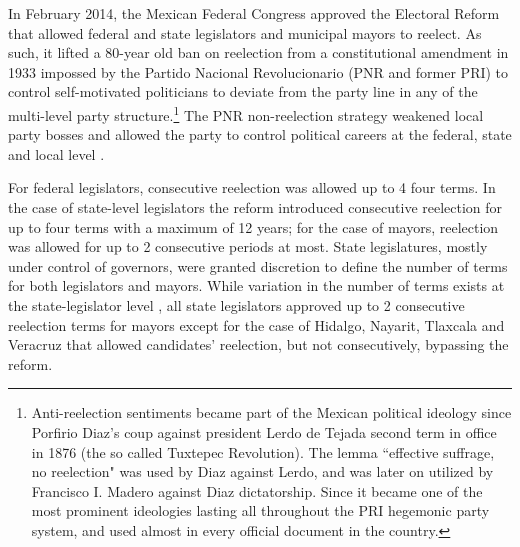 \documentclass[12pt]{amsart}
\makeatletter
\def\section{\@startsection{section}{1}
	\z@{1.0\linespacing\@plus\linespacing}{.5\linespacing}{\Large}}
\numberwithin{equation}{section}
\theoremstyle{definition}
\theoremstyle{definition}
\theoremstyle{definition}
\makeatother
\begin{document}


\section{Term Limit Reform of 2014 \label{sec:reform}} 

In February 2014, the Mexican Federal Congress approved the Electoral Reform that allowed federal and state legislators and municipal mayors to reelect. As such, it lifted a 80-year old ban on reelection from a constitutional amendment in 1933 impossed by the Partido Nacional Revolucionario (PNR and former PRI) to control self-motivated politicians to deviate from the party line in any of the multi-level party structure.\footnote{Anti-reelection sentiments became part of the Mexican political ideology since Porfirio Diaz's coup against president Lerdo de Tejada second term in office in 1876 (the so called Tuxtepec Revolution). The lemma ``effective suffrage, no reelection" was used by Diaz against Lerdo, and was later on utilized by Francisco I. Madero against Diaz dictatorship. Since it became one of the most prominent ideologies lasting all throughout the PRI hegemonic party system, and used almost in every official document in the country.} The PNR non-reelection strategy weakened local party bosses and allowed the party to control political careers at the federal, state and local level \citep{weldon_2003}. 

For federal legislators, consecutive reelection was allowed up to 4 four terms. In the case of state-level legislators the reform introduced consecutive reelection for up to four terms with a maximum of 12 years; for the case of mayors, reelection was allowed for up to 2 consecutive periods at most. State legislatures, mostly under control of governors, were granted discretion to define the number of terms for both legislators and mayors. While variation in the number of terms exists at the state-legislator level \citep{motolinia_2020}, all state legislators approved up to 2 consecutive reelection terms for mayors except for the case of Hidalgo, Nayarit, Tlaxcala and Veracruz that allowed candidates' reelection, but not consecutively, bypassing the reform.  
 
\end{document}
